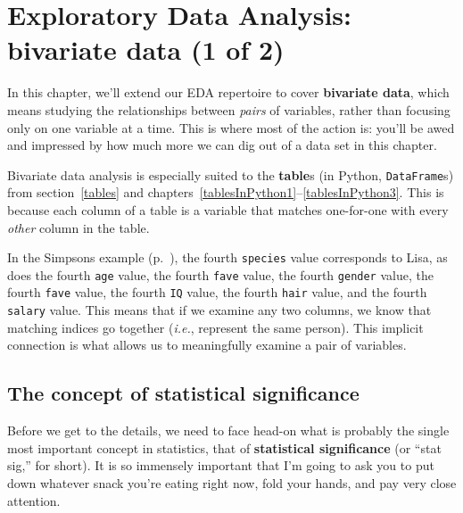 
\chapter{Exploratory Data Analysis: bivariate data (1 of 2)}
\label{ch:edaBivariate}


In this chapter, we'll extend our EDA repertoire to cover \textbf{bivariate
data}, which means studying the relationships between \textit{pairs} of
variables, rather than focusing only on one variable at a time. This is where
most of the action is: you'll be awed and impressed by how much more we can dig
out of a data set in this chapter.


Bivariate data analysis is especially suited to the \textbf{table}s (in Python,
\texttt{DataFrame}s) from section~\ref{tables} and
chapters~\ref{tablesInPython1}--\ref{tablesInPython3}. This is because each
column of a table is a variable that matches one-for-one with every
\textit{other} column in the table.


In the Simpsons example (p.~\pageref{finalSimpsons}), the fourth
\texttt{species} value corresponds to Lisa, as does the fourth \texttt{age}
value, the fourth \texttt{fave} value, the fourth \texttt{gender} value,
the fourth \texttt{fave} value, the fourth \texttt{IQ} value, the fourth
\texttt{hair} value, and the fourth \texttt{salary} value. This means that if
we examine any two columns, we know that matching indices go together
(\textit{i.e.}, represent the same person). This implicit connection is what
allows us to meaningfully examine a pair of variables.

\section{The concept of statistical significance}


Before we get to the details, we need to face head-on what is probably the
single most important concept in statistics, that of \textbf{statistical
significance} (or ``stat sig,'' for short). It is so immensely important that
I'm going to ask you to put down whatever snack you're eating right now, fold
your hands, and pay very close attention.



